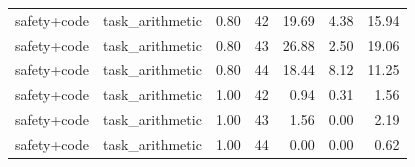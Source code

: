 \begin{table}[H]
{\begin{tabular}{llllrrr}
safety+code & task\_arithmetic & 0.80 & 42 & 19.69 & 4.38 & 15.94 \\
safety+code & task\_arithmetic & 0.80 & 43 & 26.88 & 2.50 & 19.06 \\
safety+code & task\_arithmetic & 0.80 & 44 & 18.44 & 8.12 & 11.25 \\
safety+code & task\_arithmetic & 1.00 & 42 & 0.94 & 0.31 & 1.56 \\
safety+code & task\_arithmetic & 1.00 & 43 & 1.56 & 0.00 & 2.19 \\
safety+code & task\_arithmetic & 1.00 & 44 & 0.00 & 0.00 & 0.62 \\
\bottomrule
\end{tabular}
}
\end{table}


